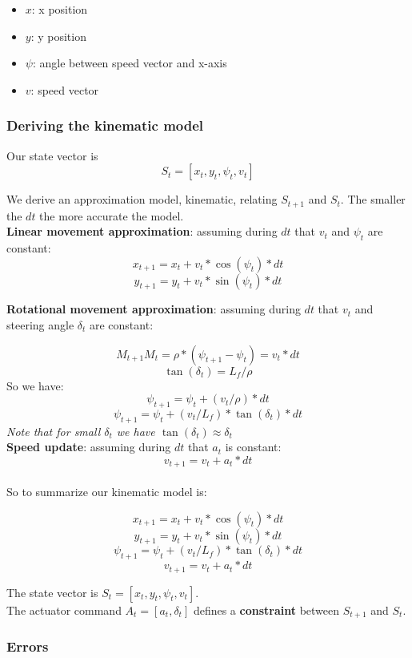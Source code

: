 \documentclass[11pt]{article}
\begin{document}
\begin{itemize}
\item $x$: x position
\item $y$: y position
\item $\psi$: angle between speed vector and x-axis
\item $v$: speed vector
\end{itemize}

\subsubsection{Deriving the kinematic model}


Our state vector is $$ S_t = [x_t, y_t, \psi_t, v_t] $$

We derive an approximation model, kinematic, relating $S_{t+1}$ and $S_t$. The smaller the $dt$ the more accurate the model. \\

\textbf{Linear movement approximation}: assuming during $dt$ that $v_t$ and $\psi_t$ are constant:
$$ x_{t+1} = x_t + v_t * \cos(\psi_t) *  dt $$
$$ y_{t+1} = y_t + v_t * \sin(\psi_t) *  dt $$

\textbf{Rotational movement approximation}: assuming during $dt$ that $v_t$ and steering angle $\delta_t$ are constant:

$$ {M_{t+1}M_{t}} = \rho * (\psi_{t+1} - \psi_t) = v_t * dt$$
$$ \tan(\delta_t) = L_f / \rho $$
So we have:
$$ \psi_{t+1} = \psi_t + (v_t /\rho) * dt$$
$$ \psi_{t+1} = \psi_t + (v_t / L_f) * \tan(\delta_t) * dt $$
\textit{Note that for small $\delta_t$ we have $\tan(\delta_t) \approx \delta_t$} \\

\textbf{Speed update}: assuming during $dt$ that $a_t$ is constant:
$$ v_{t+1} = v_t + a_t * dt $$ \\

So to summarize our kinematic model is:

$$ x_{t+1} = x_t + v_t * \cos(\psi_t) *  dt $$
$$ y_{t+1} = y_t + v_t * \sin(\psi_t) *  dt $$
$$ \psi_{t+1} = \psi_t + (v_t / L_f) * \tan(\delta_t) * dt $$
$$ v_{t+1} = v_t + a_t * dt $$

The state vector is $ S_t = [x_t, y_t, \psi_t, v_t] $. \\
The actuator command $ A_t = [ a_t, \delta_t ] $ defines a \textbf{constraint} between $S_{t+1}$ and $ S_t $.


\subsubsection{Errors}
\end{document}
